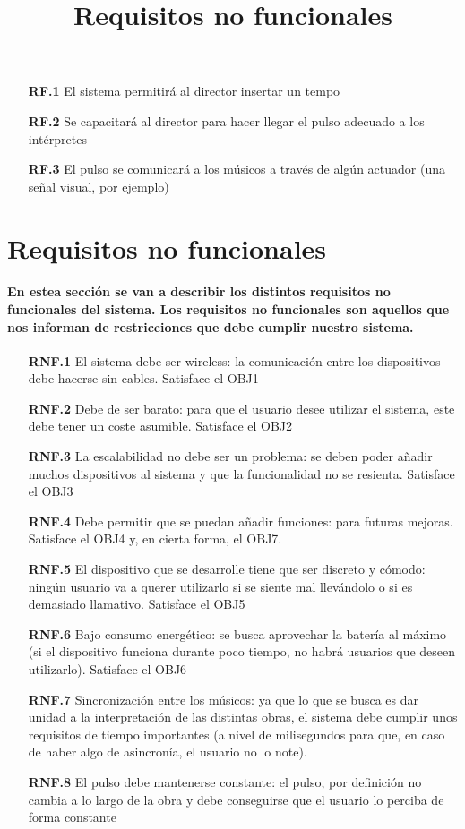 \begin{itemize}
    \item[\textbf{RF.1}] El sistema permitirá al director insertar un tempo
    \item[\textbf{RF.2}] Se capacitará al director para hacer llegar el pulso adecuado a los intérpretes
    \item[\textbf{RF.3}] El pulso se comunicará a los músicos a través de algún actuador (una señal visual, por ejemplo)
\end{itemize}


\title{Requisitos no funcionales}
\section{Requisitos no funcionales}

\paragraph{
En estea sección se van a describir los distintos requisitos no funcionales del sistema.
Los requisitos no funcionales son aquellos que nos informan de restricciones que debe cumplir
nuestro sistema.
}

\begin{itemize}
    \item[\textbf{RNF.1}] El sistema debe ser wireless: la comunicación entre los
      dispositivos debe hacerse sin cables. Satisface el OBJ1
    \item[\textbf{RNF.2}] Debe de ser barato: para que el usuario desee utilizar
      el sistema, este debe tener un coste asumible. Satisface el OBJ2
    \item[\textbf{RNF.3}] La escalabilidad no debe ser un problema: se deben poder añadir
      muchos dispositivos al sistema y que la funcionalidad no se resienta. Satisface el
      OBJ3
    \item[\textbf{RNF.4}] Debe permitir que se puedan añadir funciones: para futuras mejoras.
      Satisface el OBJ4 y, en cierta forma, el OBJ7.
    \item[\textbf{RNF.5}] El dispositivo que se desarrolle tiene que ser discreto y cómodo:
      ningún usuario va a querer utilizarlo si se siente mal llevándolo o si es demasiado llamativo.
      Satisface el OBJ5
    \item[\textbf{RNF.6}] Bajo consumo energético: se busca aprovechar la batería al máximo
      (si el dispositivo funciona durante poco tiempo, no habrá usuarios que deseen utilizarlo).
      Satisface el OBJ6
    \item[\textbf{RNF.7}] Sincronización entre los músicos: ya que lo que se busca es dar unidad
      a la interpretación de las distintas obras, el sistema debe cumplir unos requisitos de tiempo
      importantes (a nivel de milisegundos para que, en caso de haber algo de asincronía, el usuario no lo note).
    \item[\textbf{RNF.8}] El pulso debe mantenerse constante: el pulso, por definición
      no cambia a lo largo de la obra y debe conseguirse que el usuario lo perciba de forma
      constante
\end{itemize}


